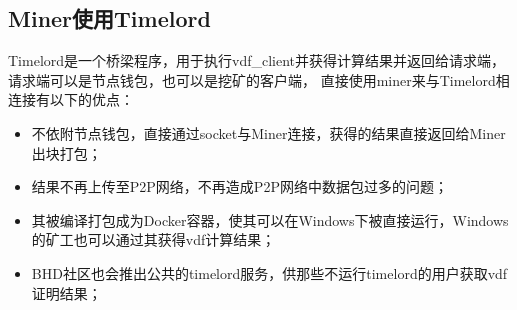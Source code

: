 \subsection{Miner使用Timelord}
\begin{flushleft}
    Timelord是一个桥梁程序，用于执行vdf\_client并获得计算结果并返回给请求端，请求端可以是节点钱包，也可以是挖矿的客户端，
    直接使用miner来与Timelord相连接有以下的优点：
\end{flushleft}
\begin{itemize}
    \item 不依附节点钱包，直接通过socket与Miner连接，获得的结果直接返回给Miner出块打包；
    \item 结果不再上传至P2P网络，不再造成P2P网络中数据包过多的问题；
    \item 其被编译打包成为Docker容器，使其可以在Windows下被直接运行，Windows的矿工也可以通过其获得vdf计算结果；
    \item BHD社区也会推出公共的timelord服务，供那些不运行timelord的用户获取vdf证明结果；
\end{itemize}
